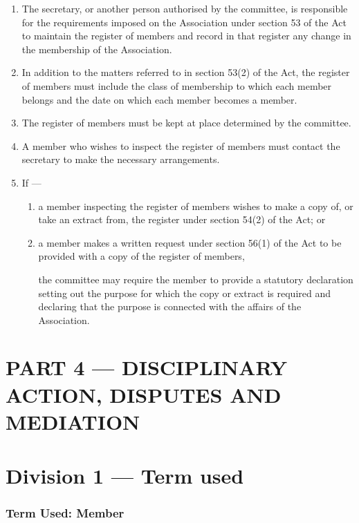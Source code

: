 \begin{enumerate}

\item The secretary, or another person authorised by the committee, is responsible for the requirements imposed on the Association under section 53 of the Act to maintain the register of members and record in that register any change in the membership of the Association.
\item In addition to the matters referred to in section 53(2) of the Act, the register of members must include the class of membership to which each member belongs and the date on which each member becomes a member.
\item The register of members must be kept at place determined by the committee.
\item A member who wishes to inspect the register of members must contact the secretary to make the necessary arrangements.
\item If ---

  \begin{enumerate}
  \item a member inspecting the register of members wishes to make a copy of, or take an extract from, the register under section 54(2) of the Act; or
  \item a member makes a written request under section 56(1) of the Act to be provided with a copy of the register of members,

    the committee may require the member to provide a statutory declaration setting out the purpose for which the copy or extract is required and declaring that the purpose is connected with the affairs of the Association.
  \end{enumerate}
\end{enumerate}

\hypertarget{part-4-disciplinary-action-disputes-and-mediation}{%
\part{PART 4 --- DISCIPLINARY ACTION, DISPUTES AND MEDIATION}\label{part-4-disciplinary-action-disputes-and-mediation}}

\hypertarget{division-1-term-used}{%
\part*{Division 1 --- Term used}\label{division-1-term-used}}

\hypertarget{term-used-member}{%
\section{Term Used: Member}\label{term-used-member}}

